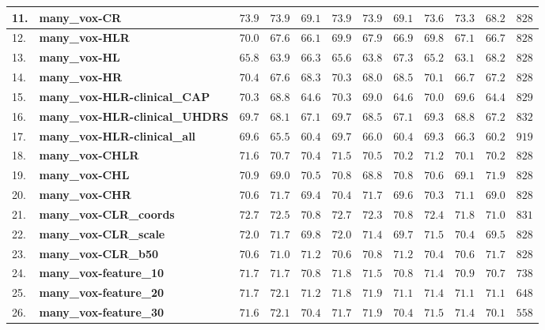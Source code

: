 {\begin{longtable}[H]{|p{0.6cm}|p{10.3cm}|p{1.1cm}|p{1.1cm}|p{1.1cm}|p{1.1cm}|p{1.1cm}|p{1.1cm}|p{1.1cm}|p{1.1cm}|p{1.1cm}|r|}
11. & \textbf{many\_vox-CR} & $73.9$ & $73.9$ & $69.1$ & $73.9$ & $73.9$ & $69.1$ & $73.6$ & $73.3$ & $68.2$ & $828$ \\ \hline
12. & \textbf{many\_vox-HLR} & $70.0$ & $67.6$ & $66.1$ & $69.9$ & $67.9$ & $66.9$ & $69.8$ & $67.1$ & $66.7$ & $828$ \\ \hline
13. & \textbf{many\_vox-HL} & $65.8$ & $63.9$ & $66.3$ & $65.6$ & $63.8$ & $67.3$ & $65.2$ & $63.1$ & $68.2$ & $828$ \\ \hline
14. & \textbf{many\_vox-HR} & $70.4$ & $67.6$ & $68.3$ & $70.3$ & $68.0$ & $68.5$ & $70.1$ & $66.7$ & $67.2$ & $828$ \\ \hline
15. & \textbf{many\_vox-HLR-clinical\_CAP} & $70.3$ & $68.8$ & $64.6$ & $70.3$ & $69.0$ & $64.6$ & $70.0$ & $69.6$ & $64.4$ & $829$ \\ \hline
16. & \textbf{many\_vox-HLR-clinical\_UHDRS} & $69.7$ & $68.1$ & $67.1$ & $69.7$ & $68.5$ & $67.1$ & $69.3$ & $68.8$ & $67.2$ & $832$ \\ \hline
17. & \textbf{many\_vox-HLR-clinical\_all} & $69.6$ & $65.5$ & $60.4$ & $69.7$ & $66.0$ & $60.4$ & $69.3$ & $66.3$ & $60.2$ & $919$ \\ \hline
18. & \textbf{many\_vox-CHLR} & $71.6$ & $70.7$ & $70.4$ & $71.5$ & $70.5$ & $70.2$ & $71.2$ & $70.1$ & $70.2$ & $828$ \\ \hline
19. & \textbf{many\_vox-CHL} & $70.9$ & $69.0$ & $70.5$ & $70.8$ & $68.8$ & $70.8$ & $70.6$ & $69.1$ & $71.9$ & $828$ \\ \hline
20. & \textbf{many\_vox-CHR} & $70.6$ & $71.7$ & $69.4$ & $70.4$ & $71.7$ & $69.6$ & $70.3$ & $71.1$ & $69.0$ & $828$ \\ \hline
21. & \textbf{many\_vox-CLR\_coords} & $72.7$ & $72.5$ & $70.8$ & $72.7$ & $72.3$ & $70.8$ & $72.4$ & $71.8$ & $71.0$ & $831$ \\ \hline
22. & \textbf{many\_vox-CLR\_scale} & $72.0$ & $71.7$ & $69.8$ & $72.0$ & $71.4$ & $69.7$ & $71.5$ & $70.4$ & $69.5$ & $828$ \\ \hline
23. & \textbf{many\_vox-CLR\_b50} & $70.6$ & $71.0$ & $71.2$ & $70.6$ & $70.8$ & $71.2$ & $70.4$ & $70.6$ & $71.7$ & $828$ \\ \hline
24. & \textbf{many\_vox-feature\_10} & $71.7$ & $71.7$ & $70.8$ & $71.8$ & $71.5$ & $70.8$ & $71.4$ & $70.9$ & $70.7$ & $738$ \\ \hline
25. & \textbf{many\_vox-feature\_20} & $71.7$ & $72.1$ & $71.2$ & $71.8$ & $71.9$ & $71.1$ & $71.4$ & $71.1$ & $71.1$ & $648$ \\ \hline
26. & \textbf{many\_vox-feature\_30} & $71.6$ & $72.1$ & $70.4$ & $71.7$ & $71.9$ & $70.4$ & $71.5$ & $71.4$ & $70.1$ & $558$ \\ \hline

\end{longtable}}
